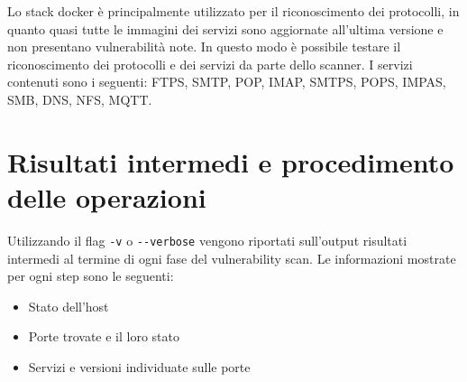 \documentclass[12pt]{report}
\begin{document}
Lo stack docker è principalmente utilizzato per il riconoscimento dei protocolli, in quanto quasi tutte le immagini dei servizi sono aggiornate all'ultima versione e non presentano vulnerabilità note. In questo modo è possibile testare il riconoscimento dei protocolli e dei servizi da parte dello scanner. I servizi contenuti sono i seguenti: FTPS, SMTP, POP, IMAP, SMTPS, POPS, IMPAS, SMB, DNS, NFS, MQTT.

\section{Risultati intermedi e procedimento delle operazioni}

Utilizzando il flag \lstinline{-v} o \lstinline{--verbose} vengono riportati sull'output risultati intermedi al termine di ogni fase del vulnerability scan. Le informazioni mostrate per ogni step sono le seguenti:
\begin{itemize}
    \item Stato dell'host
    \item Porte trovate e il loro stato
    \item  Servizi e versioni individuate sulle porte
\end{itemize}
\end{document}
